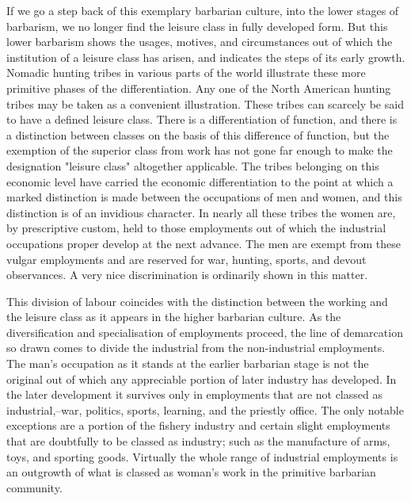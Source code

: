\documentclass[12pt]{report}
\begin{document}
If we go a step back of this exemplary barbarian culture, into the
lower stages of barbarism, we no longer find the leisure class in fully
developed form. But this lower barbarism shows the usages, motives,
and circumstances out of which the institution of a leisure class has
arisen, and indicates the steps of its early growth. Nomadic hunting
tribes in various parts of the world illustrate these more primitive
phases of the differentiation. Any one of the North American hunting
tribes may be taken as a convenient illustration. These tribes
can scarcely be said to have a defined leisure class. There is a
differentiation of function, and there is a distinction between classes
on the basis of this difference of function, but the exemption of the
superior class from work has not gone far enough to make the designation
"leisure class" altogether applicable. The tribes belonging on this
economic level have carried the economic differentiation to the point
at which a marked distinction is made between the occupations of men and
women, and this distinction is of an invidious character. In nearly
all these tribes the women are, by prescriptive custom, held to those
employments out of which the industrial occupations proper develop at
the next advance. The men are exempt from these vulgar employments and
are reserved for war, hunting, sports, and devout observances. A very
nice discrimination is ordinarily shown in this matter.

This division of labour coincides with the distinction between the
working and the leisure class as it appears in the higher barbarian
culture. As the diversification and specialisation of employments
proceed, the line of demarcation so drawn comes to divide the industrial
from the non-industrial employments. The man's occupation as it stands
at the earlier barbarian stage is not the original out of which any
appreciable portion of later industry has developed. In the later
development it survives only in employments that are not classed as
industrial,--war, politics, sports, learning, and the priestly office.
The only notable exceptions are a portion of the fishery industry
and certain slight employments that are doubtfully to be classed as
industry; such as the manufacture of arms, toys, and sporting goods.
Virtually the whole range of industrial employments is an outgrowth of
what is classed as woman's work in the primitive barbarian community.
\end{document}
